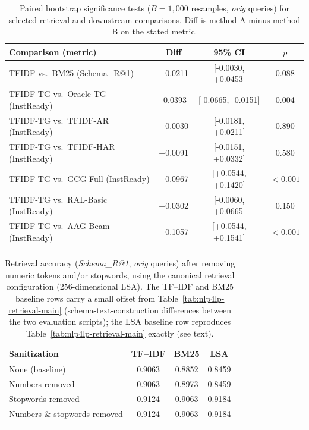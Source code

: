 \documentclass[pdflatex,sn-basic,Numbered]{sn-jnl}
\begin{document}
\begin{table}[t]
\centering
\caption{Paired bootstrap significance tests ($B=1{,}000$ resamples, \emph{orig} queries) for selected retrieval and downstream comparisons. Diff is method A minus method B on the stated metric.}
\label{tab:nlp4lp-significance}
\small
\setlength{\tabcolsep}{4pt}
\begin{tabular}{lccc}
  \toprule
  Comparison (metric) & Diff & 95\% CI & $p$ \\
  \midrule
  TFIDF vs.\ BM25 (Schema\_R@1) & +0.0211 & [-0.0030, +0.0453] & 0.088 \\
  TFIDF-TG vs.\ Oracle-TG (InstReady) & -0.0393 & [-0.0665, -0.0151] & 0.004 \\
  TFIDF-TG vs.\ TFIDF-AR (InstReady) & +0.0030 & [-0.0181, +0.0211] & 0.890 \\
  TFIDF-TG vs.\ TFIDF-HAR (InstReady) & +0.0091 & [-0.0151, +0.0332] & 0.580 \\
  TFIDF-TG vs.\ GCG-Full (InstReady) & +0.0967 & [+0.0544, +0.1420] & $<0.001$ \\
  TFIDF-TG vs.\ RAL-Basic (InstReady) & +0.0302 & [-0.0060, +0.0665] & 0.150 \\
  TFIDF-TG vs.\ AAG-Beam (InstReady) & +0.1057 & [+0.0544, +0.1541] & $<0.001$ \\
  \botrule
\end{tabular}
\end{table}

\begin{table}[t]
\centering
\caption{Retrieval accuracy (\textit{Schema\_R@1}, \emph{orig} queries) after removing numeric tokens and/or stopwords, using the canonical retrieval configuration (256-dimensional LSA). The TF--IDF and BM25 baseline rows carry a small offset from Table~\ref{tab:nlp4lp-retrieval-main} (schema-text-construction differences between the two evaluation scripts); the LSA baseline row reproduces Table~\ref{tab:nlp4lp-retrieval-main} exactly (see text).}
\label{tab:nlp4lp-overlap}
\small
\begin{tabular}{lccc}
  \toprule
  Sanitization & TF--IDF & BM25 & LSA \\
  \midrule
  None (baseline)               & 0.9063 & 0.8852 & 0.8459 \\
  Numbers removed               & 0.9063 & 0.8973 & 0.8459 \\
  Stopwords removed             & 0.9124 & 0.9063 & 0.9184 \\
  Numbers \& stopwords removed  & 0.9124 & 0.9063 & 0.9184 \\
  \botrule
\end{tabular}
\end{table}
\end{document}
